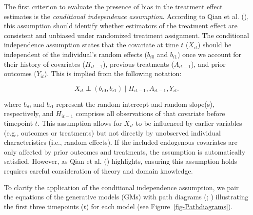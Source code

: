 \documentclass[
  11pt,
  a4paper,
]{article}
\begin{document}
The first criterion to evaluate the presence of bias in the treatment
effect estimates is the \emph{conditional independence assumption}.
According to Qian et al. (), this
assumption should identify whether estimators of the treatment effect
are consistent and unbiased under randomized treatment assignment. The
conditional independence assumption states that the covariate at time
\(t\) (\(X_{it}\)) should be independent of the individual's random
effects (\(b_{i0}\) and \(b_{i1}\)) once we account for their history of
covariates (\(H_{it-1}\)), previous treatments (\(A_{it-1}\)), and prior
outcomes (\(Y_{it}\)). This is implied from the following notation:

\[ 
X_{it} \perp (b_{i0}, b_{i1}) \mid H_{it-1}, A_{it-1}, Y_{it}.
\]

where \(b_{i0}\) and \(b_{i1}\) represent the random intercept and
random slope(s), respectively, and \(H_{it-1}\) comprises all
observations of that covariate before timepoint \(t\). This assumption
allows for \(X_{it}\) to be influenced by earlier variables (e.g.,
outcomes or treatments) but not directly by unobserved individual
characteristics (i.e., random effects). If the included endogenous
covariates are only affected by prior outcomes and treatments, the
assumption is automatically satisfied. However, as Qian et al.
() highlights, ensuring this assumption
holds requires careful consideration of theory and domain knowledge.

To clarify the application of the conditional independence assumption,
we pair the equations of the generative models (GMs) with path diagrams
(;
) illustrating the first three
timepoints (\(t\)) for each model (see Figure~\ref{fig-Pathdiagrams}).
\end{document}
